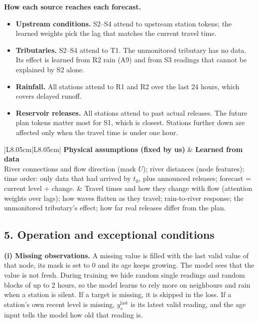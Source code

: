 \documentclass[11pt,a4paper]{article}
\begin{document}
\textbf{How each source reaches each forecast.}
\begin{itemize}
  \item \textbf{Upstream conditions.} S2--S4 attend to upstream station tokens; the learned weights pick the lag that matches the current travel time.
  \item \textbf{Tributaries.} S2--S4 attend to T1. The unmonitored tributary has no data. Its effect is learned from R2 rain (A9) and from S3 readings that cannot be explained by S2 alone.
  \item \textbf{Rainfall.} All stations attend to R1 and R2 over the last 24 hours, which covers delayed runoff.
  \item \textbf{Reservoir releases.} All stations attend to past actual releases. The future plan tokens matter most for S1, which is closest. Stations further down are affected only when the travel time is under one hour.
\end{itemize}

\begin{longtable}{|L{8.05cm}|L{8.05cm}|}
\hline
\textbf{Physical assumptions (fixed by us)} & \textbf{Learned from data} \\ \hline
River connections and flow direction (mask $U$); river distances (node features); time order: only data that had arrived by $t_0$, plus announced releases; forecast = current level + change. &
Travel times and how they change with flow (attention weights over lags); how waves flatten as they travel; rain-to-river response; the unmonitored tributary's effect; how far real releases differ from the plan. \\ \hline
\end{longtable}

\subsection*{5. Operation and exceptional conditions}

\textbf{(i) Missing observations.} A missing value is filled with the last valid value of that node, its mask is set to 0 and its age keeps growing. The model sees that the value is not fresh. During training we hide random single readings and random blocks of up to 2 hours, so the model learns to rely more on neighbours and rain when a station is silent. If a target is missing, it is skipped in the loss. If a station's own recent level is missing, $y^{\text{last}}_s$ is its latest valid reading, and the age input tells the model how old that reading is.
\end{document}
